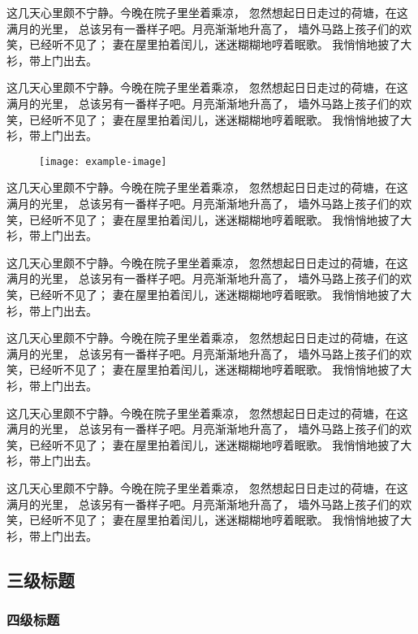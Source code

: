 \documentclass[printMode]{ecnuthesis}
\begin{document}
这几天心里颇不宁静。今晚在院子里坐着乘凉，
忽然想起日日走过的荷塘，在这满月的光里，
总该另有一番样子吧。月亮渐渐地升高了，
墙外马路上孩子们的欢笑，已经听不见了；
妻在屋里拍着闰儿，迷迷糊糊地哼着眠歌。
我悄悄地披了大衫，带上门出去。

这几天心里颇不宁静。今晚在院子里坐着乘凉，
忽然想起日日走过的荷塘，在这满月的光里，
总该另有一番样子吧。月亮渐渐地升高了，
墙外马路上孩子们的欢笑，已经听不见了；
妻在屋里拍着闰儿，迷迷糊糊地哼着眠歌。
我悄悄地披了大衫，带上门出去。

\begin{figure}[htb]
  \centering
  \texttt{[image: example-image]}
\end{figure}

这几天心里颇不宁静。今晚在院子里坐着乘凉，
忽然想起日日走过的荷塘，在这满月的光里，
总该另有一番样子吧。月亮渐渐地升高了，
墙外马路上孩子们的欢笑，已经听不见了；
妻在屋里拍着闰儿，迷迷糊糊地哼着眠歌。
我悄悄地披了大衫，带上门出去。

这几天心里颇不宁静。今晚在院子里坐着乘凉，
忽然想起日日走过的荷塘，在这满月的光里，
总该另有一番样子吧。月亮渐渐地升高了，
墙外马路上孩子们的欢笑，已经听不见了；
妻在屋里拍着闰儿，迷迷糊糊地哼着眠歌。
我悄悄地披了大衫，带上门出去。

这几天心里颇不宁静。今晚在院子里坐着乘凉，
忽然想起日日走过的荷塘，在这满月的光里，
总该另有一番样子吧。月亮渐渐地升高了，
墙外马路上孩子们的欢笑，已经听不见了；
妻在屋里拍着闰儿，迷迷糊糊地哼着眠歌。
我悄悄地披了大衫，带上门出去。

这几天心里颇不宁静。今晚在院子里坐着乘凉，
忽然想起日日走过的荷塘，在这满月的光里，
总该另有一番样子吧。月亮渐渐地升高了，
墙外马路上孩子们的欢笑，已经听不见了；
妻在屋里拍着闰儿，迷迷糊糊地哼着眠歌。
我悄悄地披了大衫，带上门出去。

这几天心里颇不宁静。今晚在院子里坐着乘凉，
忽然想起日日走过的荷塘，在这满月的光里，
总该另有一番样子吧。月亮渐渐地升高了，
墙外马路上孩子们的欢笑，已经听不见了；
妻在屋里拍着闰儿，迷迷糊糊地哼着眠歌。
我悄悄地披了大衫，带上门出去。

\subsection{三级标题}

\subsubsection{四级标题}
\end{document}
